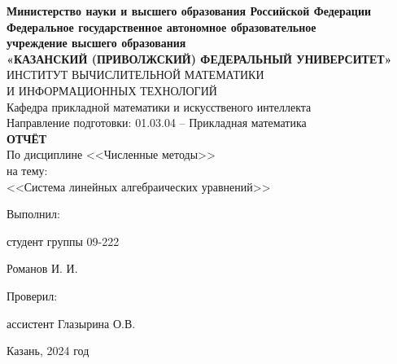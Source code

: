 \documentclass[a4paper,12pt]{article}
\begin{document}
\begin{center}
\hfill \break
\textbf{\large{Министерство науки и высшего образования Российской Федерации\\
Федеральное государственное автономное образовательное\\
учреждение высшего образования}}
\\
\large{\textbf{«КАЗАНСКИЙ (ПРИВОЛЖСКИЙ) ФЕДЕРАЛЬНЫЙ УНИВЕРСИТЕТ»}}\\
\hfill \break
\large{ИНСТИТУТ ВЫЧИСЛИТЕЛЬНОЙ МАТЕМАТИКИ\\ И ИНФОРМАЦИОННЫХ ТЕХНОЛОГИЙ}\\
\hfill \break
\large{Кафедра прикладной математики и искусственого интеллекта}\\
\hfill\break
\hfill \break
\large{Направление подготовки: 01.03.04 – Прикладная математика}\\
\hfill \break
\hfill \break
\textbf{\large{ОТЧЁТ}}\\
\large{По дисциплине <<Численные методы>>}\\
\large{на тему:}\\
\large{<<Система линейных алгебраических уравнений>>}\\
\hfill \break
\hfill \break
\end{center}

\hfill \break
\begin{flushright}
			
    \large{Выполнил:}
    
    \large{студент группы 09-222}
    
    \large{Романов И. И.}
    
    \large{Проверил:}
    
    \large{ассистент Глазырина О.В.}
    
\end{flushright}
\vfill
\begin{center} \large{Казань, 2024 год} \end{center}
\thispagestyle{empty}
 
\end{document}
